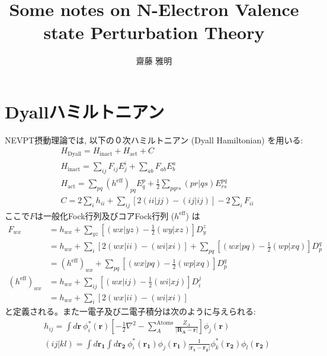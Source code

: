 \documentclass[11pt,pra,aps]{revtex4}
\begin{document}
\title{Some notes on N-Electron Valence state Perturbation Theory}
\author{齋藤 雅明}

\maketitle

\section{Dyallハミルトニアン}

NEVPT摂動理論\cite{angeliintroduction2001,angelin-electron2002,angelinew2006,angelithird-order2006}では, 以下の０次ハミルトニアン (Dyall Hamiltonian) \cite{dyallthe1995}を用いる:
%
\begin{align}
  & H_\text{Dyall} = H_\text{inact} + H_\text{act} + C \label{eq:Dyall}\\
  & H_\text{inact} = \sum_{ij} F_{ij} E^i_j + \sum_{ab} F_{ab} E^a_b \\ 
  & H_\text{act}   = \sum_{pq} (h^\text{eff})_{pq}E^p_q + \frac{1}{2}\sum_{pqrs} (pr|qs) E^{pq}_{rs} \\ 
  & C = 2\sum_i h_{ii} + \sum_{ij} [2(ii|jj)-(ij|ij)] - 2\sum_i F_{ii}\label{eq:C}
\end{align}
%
ここで$F$は一般化Fock行列及びコアFock行列 ($h^\text{eff}$) は
\begin{align}
  F_{wx} &= h_{wx} + \sum_{yz} \left[ (wx|yz) - \frac{1}{2}(wy|xz)\right] D_y^z \nonumber \\
         &= h_{wx} + \sum_{i} \left[2(wx|ii) - (wi|xi)\right] + \sum_{pq} \left[(wx|pq)-\frac{1}{2}(wp|xq)\right] D_p^q \nonumber \\
         &= (h^\text{eff})_{wx} + \sum_{pq} \left[(wx|pq)-\frac{1}{2}(wp|xq)\right] D_p^q \label{eq:genFock} \\
  (h^\text{eff})_{wx} &= h_{wx} + \sum_{ij} \left[ (wx|ij) - \frac{1}{2}(wi|xj)\right] D_i^j \nonumber \\
                      &= h_{wx} + \sum_{i} \left[2(wx|ii) - (wi|xi)\right] \label{eq:heff}
\end{align}
と定義される。また一電子及び二電子積分は次のように与えられる:
%
\begin{align}
  & h_{ij} = \int d\mathbf{r} \ \phi^{*}_i (\mathbf{r})\left[-\frac{1}{2}\nabla^{2}-\sum_A^\text{Atoms} \frac{Z_A}{|\mathbf{R_A}-\mathbf{r}|}\right]\phi_j(\mathbf{r}) \\
  & (ij|kl) = \int d\mathbf{r_1} \int d\mathbf{r_2} \ \phi^{*}_i (\mathbf{r_1}) \phi_j (\mathbf{r_1}) \frac{1}{|\mathbf{r_1}-\mathbf{r_2}|} \phi^{*}_k(\mathbf{r_2}) \phi_l(\mathbf{r_2}) \\
\end{align}
\end{document}

